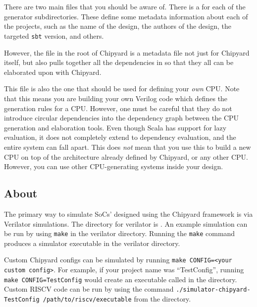 \section{}\label{sec:build.sbt}
There are two main  files that you should be aware of.
There is a  for each of the generator subdirectories.
These define some metadata information about each of the projects, such as the name of the design, the authors of the design, the targeted \texttt{sbt} version, and others.

However, the  file in the root of Chipyard is a metadata file not just for Chipyard itself, but also pulls together all the dependencies in  so that they all can be elaborated upon with Chipyard.

This file is also the one that should be used for defining your \emph{own} CPU.\@
Note that this means you are building your own Verilog code which defines the generation rules for a CPU.\@
However, one must be careful that they do not introduce circular dependencies into the dependency graph between the CPU generation and elaboration tools.
Even though Scala has support for lazy evaluation, it does not completely extend to dependency evaluation, and the entire system can fall apart.
This does \emph{not} mean that you use this to build a new CPU on top of the architecture already defined by Chipyard, or any other CPU.\@
However, you can use other CPU-generating systems inside your design.

\subsection{About}\label{sec:About_Verilator_Simulator}
The primary way to simulate SoCs' designed using the Chipyard framework is via Verilator simulations.
The directory for verilator is .
An example simulation can be run by using \texttt{make} in the verilator directory.
Running the \texttt{make} command produces a simulator executable in the verilator directory.

Custom Chipyard configs can be simulated by running \texttt{make CONFIG=<your custom config>}.
For example, if your project name was ``TestConfig'', running \texttt{make CONFIG=TestConfig} would create an executable called  in the  directory.
Custom RISCV code can be run by using the command \texttt{./simulator-chipyard-TestConfig /path/to/riscv/executable} from the  directory.

